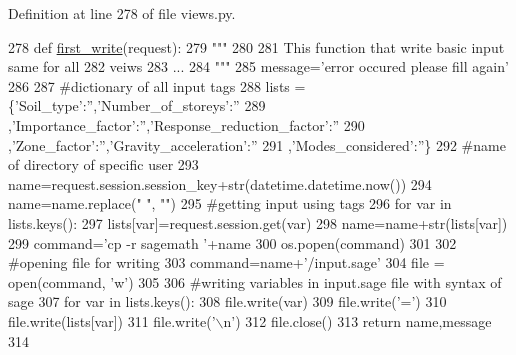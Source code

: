 Definition at line 278 of file views.\+py.


\begin{DoxyCode}
278 \textcolor{keyword}{def }\hyperlink{namespacecivilsage_1_1views_ad9397359f36a9df37e0aa43f3be032a3}{first\_write}(request):
279     \textcolor{stringliteral}{"""}
280 \textcolor{stringliteral}{}
281 \textcolor{stringliteral}{    This function that write basic input same for all}
282 \textcolor{stringliteral}{    veiws}
283 \textcolor{stringliteral}{    ...}
284 \textcolor{stringliteral}{    """}
285     message=\textcolor{stringliteral}{'error occured please fill again'}
286 
287     \textcolor{comment}{#dictionary of all input tags}
288     lists = \{\textcolor{stringliteral}{'Soil\_type'}:\textcolor{stringliteral}{''},\textcolor{stringliteral}{'Number\_of\_storeys'}:\textcolor{stringliteral}{''}
289     ,\textcolor{stringliteral}{'Importance\_factor'}:\textcolor{stringliteral}{''},\textcolor{stringliteral}{'Response\_reduction\_factor'}:\textcolor{stringliteral}{''}
290     ,\textcolor{stringliteral}{'Zone\_factor'}:\textcolor{stringliteral}{''},\textcolor{stringliteral}{'Gravity\_acceleration'}:\textcolor{stringliteral}{''}
291     ,\textcolor{stringliteral}{'Modes\_considered'}:\textcolor{stringliteral}{''}\}
292     \textcolor{comment}{#name of directory of specific user}
293     name=request.session.session\_key+str(datetime.datetime.now())
294     name=name.replace(\textcolor{stringliteral}{" "}, \textcolor{stringliteral}{""})
295     \textcolor{comment}{#getting input using tags}
296     \textcolor{keywordflow}{for} var \textcolor{keywordflow}{in} lists.keys():
297         lists[var]=request.session.get(var)
298         name=name+str(lists[var])
299     command=\textcolor{stringliteral}{'cp -r sagemath '}+name
300     os.popen(command)
301 
302     \textcolor{comment}{#opening file for writing}
303     command=name+\textcolor{stringliteral}{'/input.sage'}
304     file = open(command, \textcolor{stringliteral}{'w'})
305 
306     \textcolor{comment}{#writing variables in input.sage file with syntax of sage}
307     \textcolor{keywordflow}{for} var \textcolor{keywordflow}{in} lists.keys():
308         file.write(var)
309         file.write(\textcolor{stringliteral}{'='})
310         file.write(lists[var])
311         file.write(\textcolor{stringliteral}{'\(\backslash\)n'})
312     file.close()
313     \textcolor{keywordflow}{return} name,message
314 \end{DoxyCode}


